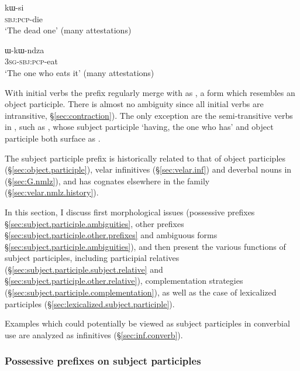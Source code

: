 \begin{exe}
\ex \label{ex:kWsi}
\gll kɯ-si  \\
  \textsc{sbj}:\textsc{pcp}-die \\
 \glt  `The dead one' (many attestations)
\end{exe}

 \begin{exe} 
\ex \label{ex:WkWndza}
\gll ɯ-kɯ-ndza \\
  \textsc{3sg}-\textsc{sbj}:\textsc{pcp}-eat \\
 \glt  `The one who eats it' (many attestations)
\end{exe}

With  initial verbs the  prefix regularly merge with  as , a form which resembles an object participle. There is almost no ambiguity since all  initial verbs are intransitive, §\ref{sec:contraction}). The only exception are the semi-transitive verbs in , such as , whose subject participle  `having, the one who has' and object participle  both surface as .

The subject participle  prefix is historically related to that of object participles (§\ref{sec:object.participle}), velar infinitives (§\ref{sec:velar.inf}) and deverbal nouns in  (§\ref{sec:G.nmlz}), and has cognates elsewhere in the family (§\ref{sec:velar.nmlz.history}).

In this section, I discuss first morphological issues (possessive prefixes §\ref{sec:subject.participle.ambiguities}, other prefixes §\ref{sec:subject.participle.other.prefixes} and ambiguous forms §\ref{sec:subject.participle.ambiguities}), and then present the various functions of subject participles, including participial relatives (§\ref{sec:subject.participle.subject.relative} and §\ref{sec:subject.participle.other.relative}), complementation strategies (§\ref{sec:subject.participle.complementation}), as well as the case of lexicalized participles (§\ref{sec:lexicalized.subject.participle}).
 
Examples which could potentially be viewed as subject participles in converbial use are analyzed as  infinitives (§\ref{sec:inf.converb}).

\subsubsection{Possessive prefixes on subject participles}  \label{sec:subject.participle.possessive}


